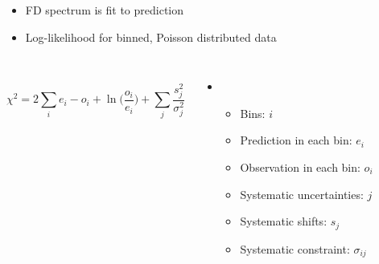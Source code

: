 \documentclass[10pt,professionalfonts,xcolor=table]{beamer}
\begin{document}
\begin{frame}
\begin{itemize}
\item FD spectrum is fit to prediction
\gap
\item Log-likelihood for binned, Poisson distributed data
\end{itemize}
\begin{columns}[c]
~
\begin{equation*}
\chi^2 = 2 \sum_i e_i - o_i + \ln \big (\frac{o_i}{e_i} \big)
+ \sum_j \frac{s_j^2}{\sigma_j^2}
\end{equation*}
  \begin{itemize}
  \item[] ~
  \begin{itemize}
  \item Bins: $i$
  \item Prediction in each bin: $e_i$
  \item Observation in each bin: $o_i$
  \item Systematic uncertainties: $j$
  \item Systematic shifts: $s_j$
  \item Systematic constraint: $\sigma_{ij}$
  \end{itemize}
  \end{itemize}
\end{columns}
\end{frame}
\end{document}
